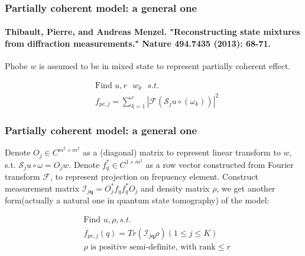 \documentclass[UTF8]{beamer}
\begin{document}
\begin{frame}[c]\frametitle{Partially coherent model: a general one}
\framesubtitle{Thibault, Pierre, and Andreas Menzel. "Reconstructing state mixtures from diffraction measurements." Nature 494.7435 (2013): 68-71.}




Phobe $w$ is assumed to be in mixed state to represent partially coherent effect.

\begin{equation}
\label{model:sep} 
\begin{aligned}
&\mbox{Find } u, r \mbox{ $w_k$   }s.t. \\
&f_{p c, j}=\sum_{k=1}^r \left|\mathcal{F}\left( \mathcal{S}_{j} u \circ \left(\omega_k\right) \right)\right|^{2}  
\end{aligned}
\end{equation}




\end{frame}




\begin{frame} \frametitle{Partially coherent model: a general one}

Denote $O_j \in C^{m^2 \times m^2}$ as a (diagonal) matrix to represent linear transform to $w$, s.t. $\mathcal{S}_{j} u \circ \omega = O_j w$. Denote $f_q^* \in C^{1 \times m^2}$ as a row vector  constructed from Fourier transform $\mathcal{F}$, to represent projection on frepuency element. Construct measurement matrix $ \mathcal{I}_{j \mathbf{q}} = O_j^*f_qf_q^*O_j$ and density matrix $\rho$, we get another form(actually a natural one in quantum state tomography) of the model:


\begin{equation}
\label{lift}
\begin{aligned}
&\mbox{Find } u,\rho,s.t.\\
&f_{pc,j}(q) = Tr(\mathcal{I}_{j \mathbf{q}} \rho ) (1\leq j \leq K)\\
&\rho \mbox{ is positive semi-definite, with rank}\leq r 
\end{aligned}
\end{equation}



\end{frame}
\end{document}
